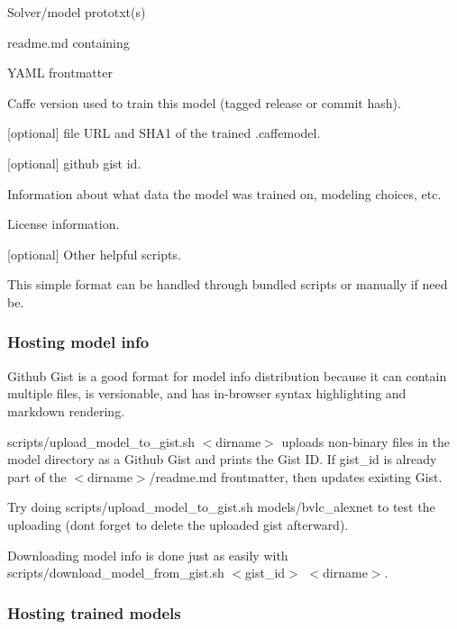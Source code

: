 \begin{DoxyItemize}
\item Solver/model prototxt(s)
\item {\ttfamily readme.\+md} containing
\begin{DoxyItemize}
\item Y\+A\+ML frontmatter
\begin{DoxyItemize}
\item Caffe version used to train this model (tagged release or commit hash).
\item \mbox{[}optional\mbox{]} file U\+RL and S\+H\+A1 of the trained {\ttfamily .caffemodel}.
\item \mbox{[}optional\mbox{]} github gist id.
\end{DoxyItemize}
\item Information about what data the model was trained on, modeling choices, etc.
\item License information.
\end{DoxyItemize}
\item \mbox{[}optional\mbox{]} Other helpful scripts.
\end{DoxyItemize}

This simple format can be handled through bundled scripts or manually if need be.

\subsubsection*{Hosting model info}

Github Gist is a good format for model info distribution because it can contain multiple files, is versionable, and has in-\/browser syntax highlighting and markdown rendering.

{\ttfamily scripts/upload\+\_\+model\+\_\+to\+\_\+gist.\+sh $<$dirname$>$} uploads non-\/binary files in the model directory as a Github Gist and prints the Gist ID. If {\ttfamily gist\+\_\+id} is already part of the {\ttfamily $<$dirname$>$/readme.md} frontmatter, then updates existing Gist.

Try doing {\ttfamily scripts/upload\+\_\+model\+\_\+to\+\_\+gist.\+sh models/bvlc\+\_\+alexnet} to test the uploading (don\textquotesingle{}t forget to delete the uploaded gist afterward).

Downloading model info is done just as easily with {\ttfamily scripts/download\+\_\+model\+\_\+from\+\_\+gist.\+sh $<$gist\+\_\+id$>$ $<$dirname$>$}.

\subsubsection*{Hosting trained models}

